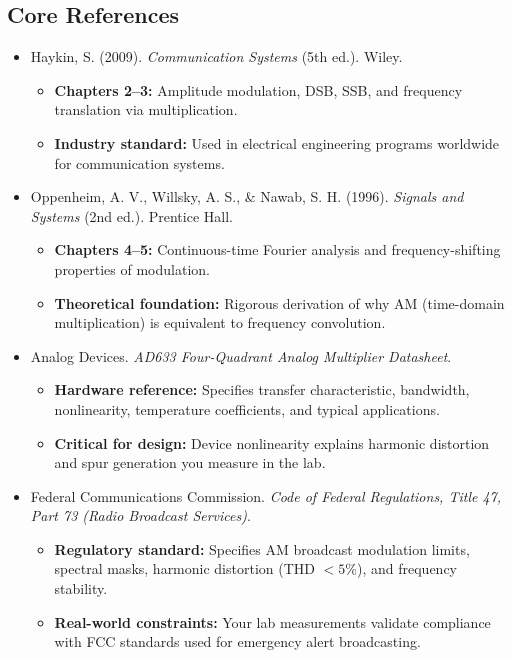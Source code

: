 \documentclass[11pt,letterpaper]{article}
\begin{document}
\subsection*{Core References}

\begin{itemize}
    \item Haykin, S. (2009). \textit{Communication Systems} (5th ed.). Wiley.
    \begin{itemize}
        \item \textbf{Chapters 2--3:} Amplitude modulation, DSB, SSB, and frequency translation via multiplication.
        \item \textbf{Industry standard:} Used in electrical engineering programs worldwide for communication systems.
    \end{itemize}

    \item Oppenheim, A. V., Willsky, A. S., \& Nawab, S. H. (1996). \textit{Signals and Systems} (2nd ed.). Prentice Hall.
    \begin{itemize}
        \item \textbf{Chapters 4--5:} Continuous-time Fourier analysis and frequency-shifting properties of modulation.
        \item \textbf{Theoretical foundation:} Rigorous derivation of why AM (time-domain multiplication) is equivalent to frequency convolution.
    \end{itemize}

    \item Analog Devices. \textit{AD633 Four-Quadrant Analog Multiplier Datasheet}.
    \begin{itemize}
        \item \textbf{Hardware reference:} Specifies transfer characteristic, bandwidth, nonlinearity, temperature coefficients, and typical applications.
        \item \textbf{Critical for design:} Device nonlinearity explains harmonic distortion and spur generation you measure in the lab.
    \end{itemize}

    \item Federal Communications Commission. \textit{Code of Federal Regulations, Title 47, Part 73 (Radio Broadcast Services)}.
    \begin{itemize}
        \item \textbf{Regulatory standard:} Specifies AM broadcast modulation limits, spectral masks, harmonic distortion (THD $< 5\%$), and frequency stability.
        \item \textbf{Real-world constraints:} Your lab measurements validate compliance with FCC standards used for emergency alert broadcasting.
    \end{itemize}


\end{itemize}
\end{document}

